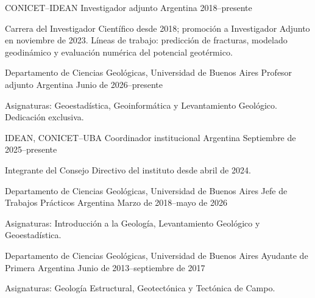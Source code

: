 

\begin{cventries}

\cventry
    {CONICET--IDEAN}
    {Investigador adjunto}
    {Argentina}
    {2018--presente}
    {
      \begin{cvitems}
        \item {Carrera del Investigador Científico desde 2018; promoción a Investigador Adjunto en noviembre de 2023. Líneas de trabajo: predicción de fracturas, modelado geodinámico y evaluación numérica del potencial geotérmico.}
      \end{cvitems}
    }

\cventry
    {Departamento de Ciencias Geológicas, Universidad de Buenos Aires}
    {Profesor adjunto}
    {Argentina}
    {Junio de 2026--presente}
    {
      \begin{cvitems}
        \item {Asignaturas: Geoestadística, Geoinformática y Levantamiento Geológico. Dedicación exclusiva.}
      \end{cvitems}
    }

\cventry
    {IDEAN, CONICET--UBA}
    {Coordinador institucional}
    {Argentina}
    {Septiembre de 2025--presente}
    {
      \begin{cvitems}
        \item {Integrante del Consejo Directivo del instituto desde abril de 2024.}
      \end{cvitems}
    }

\end{cventries}


\begin{cventries}

\cventry
    {Departamento de Ciencias Geológicas, Universidad de Buenos Aires}
    {Jefe de Trabajos Prácticos}
    {Argentina}
    {Marzo de 2018--mayo de 2026}
    {
      \begin{cvitems}
        \item {Asignaturas: Introducción a la Geología, Levantamiento Geológico y Geoestadística.}
      \end{cvitems}
    }

\cventry
    {Departamento de Ciencias Geológicas, Universidad de Buenos Aires}
    {Ayudante de Primera}
    {Argentina}
    {Junio de 2013--septiembre de 2017}
    {
      \begin{cvitems}
        \item {Asignaturas: Geología Estructural, Geotectónica y Tectónica de Campo.}
      \end{cvitems}
    }

\end{cventries}

